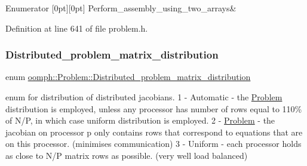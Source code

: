 \begin{DoxyEnumFields}{Enumerator}
[0pt][0pt]{}\mbox{\label{classoomph_1_1Problem_ac793c004113930938730ec04dd2245b7a1383f03857ad8602ba7edef43bd947f5}} 
Perform\+\_\+assembly\+\_\+using\+\_\+two\+\_\+arrays&\\
\hline

\end{DoxyEnumFields}


Definition at line 641 of file problem.\+h.

\mbox{\label{classoomph_1_1Problem_a8fc1f40f2a9309e9ff02772fa2258402}} 
\subsubsection{\texorpdfstring{Distributed\+\_\+problem\+\_\+matrix\+\_\+distribution}{Distributed\_problem\_matrix\_distribution}}
{\footnotesize\ttfamily enum \hyperlink{classoomph_1_1Problem_a8fc1f40f2a9309e9ff02772fa2258402}{oomph\+::\+Problem\+::\+Distributed\+\_\+problem\+\_\+matrix\+\_\+distribution}}



enum for distribution of distributed jacobians. 1 -\/ Automatic -\/ the \hyperlink{classoomph_1_1Problem}{Problem} distribution is employed, unless any processor has number of rows equal to 110\% of N/P, in which case uniform distribution is employed. 2 -\/ \hyperlink{classoomph_1_1Problem}{Problem} -\/ the jacobian on processor p only contains rows that correspond to equations that are on this processor. (minimises communication) 3 -\/ Uniform -\/ each processor holds as close to N/P matrix rows as possible. (very well load balanced) 

